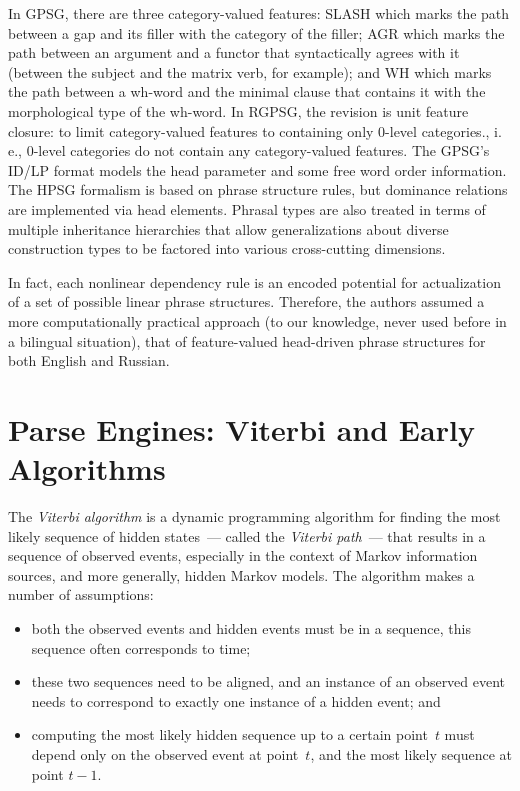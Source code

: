 \begin{multicols}{2}
     In GPSG, there are three category-valued features: SLASH which marks the 
path between a gap and its filler with the category of the filler; AGR which marks 
the path between an argument and a functor that syntactically agrees with it 
(between the subject and the matrix verb, for example); and WH which marks the path 
between a wh-word and the minimal clause that contains it with the morphological 
type of the wh-word. In RGPSG, the revision is unit feature closure: to limit 
category-valued features to containing only 0-level categories., i.\,e., 0-level 
categories do not contain any category-valued features. The GPSG's ID/LP format 
models the head parameter and some free word order information. The HPSG formalism 
is based on phrase structure rules, but dominance relations are implemented via 
head elements. Phrasal types are also treated in terms of multiple inheritance 
hierarchies that allow generalizations about diverse construction types to be 
factored into various cross-cutting dimensions. 
     
     In fact, each nonlinear dependency rule is an encoded potential for 
actualization of a set of possible linear phrase structures. Therefore, the authors assumed a 
more computationally practical approach (to our knowledge, never used before in a 
bilingual situation), that of feature-valued head-driven phrase structures for both 
English and Russian.

\section{Parse Engines: Viterbi and Early Algorithms}
     
     \noindent
     The \textit{Viterbi algorithm} is a dynamic programming algorithm for 
finding the most likely sequence of hidden states~--- called the \textit{Viterbi 
path}~--- that results in a sequence of observed events, especially in the context of 
Markov information sources, and more generally, hidden Markov models. The 
algorithm makes a number of assumptions:
     \begin{itemize}
\item both the observed events and hidden events must be in a sequence, this 
sequence often corresponds to time;
\item these two sequences need to be aligned, and an instance of an observed event 
needs to correspond to exactly one instance of a hidden event; and
\item computing the most likely hidden sequence up to a certain point~$t$ must 
depend only on the observed event at point~$t$, and the most likely sequence at point 
$t-1$.
\end{itemize}


\end{multicols}
